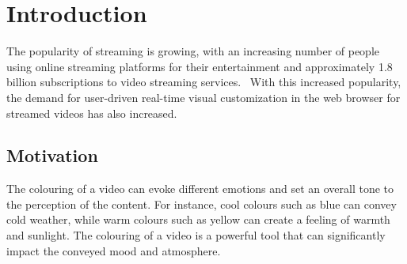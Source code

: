 \documentclass[../MasterThesis.tex]{subfiles}
\begin{document}
	\newpage
	\section{Introduction} \label{section:introduction}
	
	
	The popularity of streaming is growing, with an increasing number of people using online streaming platforms for their entertainment and approximately 1.8 billion subscriptions to video streaming services.~\cite{nielsen, stats}
	With this increased popularity, the demand for user-driven real-time visual customization in the web browser for streamed videos has also increased.
	
	
	
	
	
	
	
	
	
	
	
	
	
	
	
	
	
	
	\subsection{Motivation} \label{subsection:motivation}
	
	
	The colouring of a video can evoke different emotions and set an overall tone to the perception of the content. For instance, cool colours such as blue can convey cold weather, while warm colours such as yellow can create a feeling of warmth and sunlight. 
	The colouring of a video is a powerful tool that can significantly impact the conveyed mood and atmosphere.~\cite{colorgrading1, colorgrading2}
	
	
\end{document}
